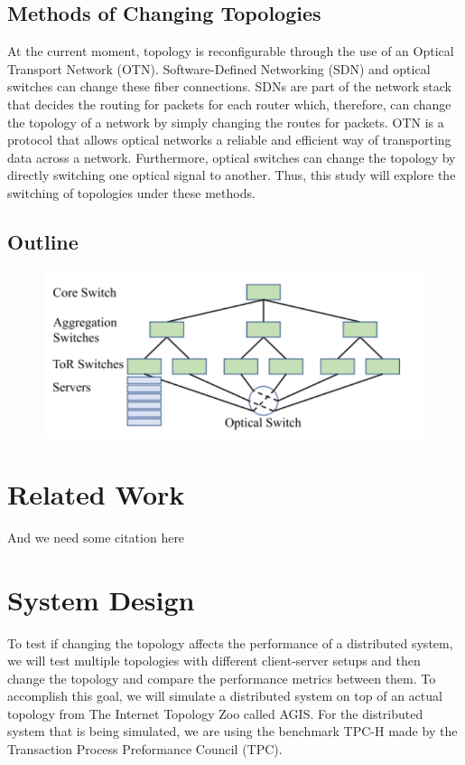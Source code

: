 \subsection{Methods of Changing Topologies}

\indent At the current moment, topology is reconfigurable through the use of an Optical Transport Network (OTN). Software-Defined Networking (SDN) and optical switches can change these fiber connections. SDNs are part of the network stack that decides the routing for packets for each router which, therefore, can change the topology of a network by simply changing the routes for packets. OTN is a protocol that allows optical networks a reliable and efficient way of transporting data across a network. Furthermore, optical switches can change the topology by directly switching one optical signal to another. Thus, this study will explore the switching of topologies under these methods.

\subsection{Outline}



\begin{figure}[tp]
\centering
\includegraphics[width=0.5 \textwidth]{figures/switches}
\caption{\blindtext}
\end{figure}

\section{Related Work}

And we need some citation here\cite{floyd1993random, stoica2001chord}


\section{System Design}

\indent To test if changing the topology affects the performance of a distributed system, we will test multiple topologies with different client-server setups and then change the topology and compare the performance metrics between them. To accomplish this goal, we will simulate a distributed system on top of an actual topology from The Internet Topology Zoo called AGIS. For the distributed system that is being simulated, we are using the benchmark TPC-H made by the Transaction Process Preformance Council (TPC).

